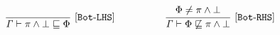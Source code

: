  \begin{gather*}
  \codeme{\frac{
\begin{matrix}
\end{matrix}
}{\text{\code{ \Gamma  \vdash \pi \wedge \bot    \CONTAIN \effect }}}\ [Bot\text{-}LHS]}
\qquad\qquad\quad
\codeme{\frac{
\begin{matrix}
  \effect \neq  \pi \wedge \bot  
\end{matrix}
}{\text{\code{\Gamma  \vdash  \effect \not\CONTAIN  \pi \wedge \bot  }}} \ \codeme{  [Bot\text{-}RHS]} }
\end{gather*}